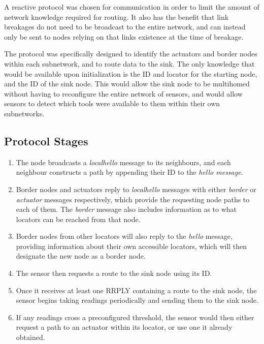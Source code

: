 \documentclass[12pt]{article}
\begin{document}
A reactive protocol was chosen for communication in order to limit the amount of network knowledge required for routing. It also has the benefit that link breakages do not need to be broadcast to the entire network, and can instead only be sent to nodes relying on that links existence at the time of breakage.

The protocol was specifically designed to identify the actuators and border nodes within each subnetwork, and to route data to the sink. The only knowledge that would be available upon initialization is the ID and locator for the starting node, and the ID of the sink node. This would allow the sink node to be multihomed without having to reconfigure the entire network of sensors, and would allow sensors to detect which tools were available to them within their own subnetworks. 

\FloatBarrier

\subsection{Protocol Stages}

\begin{enumerate}
	\item The node broadcasts a \emph{localhello} message to its neighbours, and each neighbour constructs a path by appending their ID to the \emph{hello message}. 
	\item Border nodes and actuators reply to \emph{localhello} messages with either \emph{border} or \emph{actuator} messages respectively, which provide the requesting node paths to each of them. The \emph{border} message also includes information as to what locators can be reached from that node.
	\item Border nodes from other locators will also reply to the \emph{hello} message, providing information about their own accessible locators, which will then designate the new node as a border node.
	\item The sensor then requests a route to the sink node using its ID.
	\item Once it receives at least one RRPLY containing a route to the sink node, the sensor begins taking readings periodically and sending them to the sink node. 
	\item If any readings cross a preconfigured threshold, the sensor would then either request a path to an actuator within its locator, or use one it already obtained.
\end{enumerate}
\end{document}
